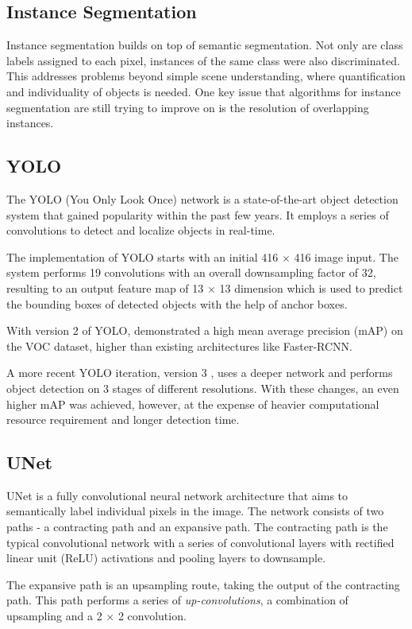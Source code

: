 \documentclass[journal]{IEEEtran}
\begin{document}
\subsection{Instance Segmentation}
Instance segmentation builds on top of semantic segmentation. Not only are class labels assigned to each pixel, instances of the same class were also discriminated. This addresses problems beyond simple scene understanding, where quantification and individuality of objects is needed. One key issue that algorithms for instance segmentation are still trying to improve on is the resolution of overlapping instances.
\subsection{YOLO}
The YOLO (You Only Look Once) network \cite{redmon2016yolo9000} is a state-of-the-art object detection system that gained popularity within the past few years. It employs a series of convolutions to detect and localize objects in real-time.

The implementation of YOLO starts with an initial 416 $\times$ 416 image input. The system performs 19 convolutions with an overall downsampling factor of 32, resulting to an output feature map of 13 $\times$ 13 dimension which is used to predict the bounding boxes of detected objects with the help of anchor boxes.

With version 2 of YOLO, \cite{redmon2016yolo9000} demonstrated a high mean average precision (mAP) on the VOC dataset, higher than existing architectures like Faster-RCNN.

A more recent YOLO iteration, version 3 \cite{yolov3}, uses a deeper network and performs object detection on 3 stages of different resolutions. With these changes, an even higher mAP was achieved, however, at the expense of heavier computational resource requirement and longer detection time.
\subsection{UNet}
UNet\cite{RFB15a} is a fully convolutional neural network architecture that aims to semantically label individual pixels in the image. The network consists of two paths - a contracting path and an expansive path. The contracting path is the typical convolutional network with a series of convolutional layers with rectified linear unit (ReLU) activations and pooling layers to downsample.

The expansive path is an upsampling route, taking the output of the contracting path. This path performs a series of \textit{up-convolutions}, a combination of upsampling and a 2 $\times$ 2 convolution.
\end{document}
